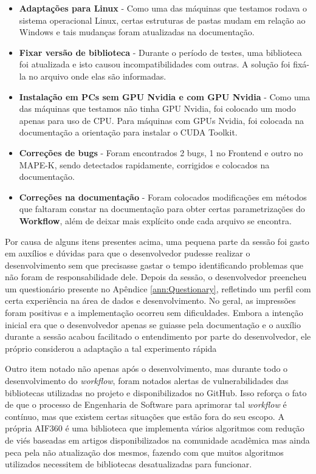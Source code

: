 \documentclass[portugues]{ic-tese}
\begin{document}
\begin{itemize}
\item \textbf{Adaptações para Linux} - Como uma das máquinas que testamos rodava o sistema operacional Linux, certas estruturas de pastas mudam em relação ao Windows e tais mudanças foram atualizadas na documentação.
\item \textbf{Fixar versão de biblioteca} - Durante o período de testes, uma biblioteca foi atualizada e isto causou incompatibilidades com outras. A solução foi fixá-la no arquivo onde elas são informadas.
\item \textbf{Instalação em PCs sem GPU Nvidia e com GPU Nvidia} - Como uma das máquinas que testamos não tinha GPU Nvidia, foi colocado um modo apenas para uso de CPU. Para máquinas com GPUs Nvidia, foi colocada na documentação a orientação para instalar o CUDA Toolkit.
\item \textbf{Correções de bugs} - Foram encontrados 2 bugs, 1 no Frontend e outro no MAPE-K, sendo detectados rapidamente, corrigidos e colocados na documentação.
\item \textbf{Correções na documentação} - Foram colocados modificações em métodos que faltaram constar na documentação para obter certas parametrizações do \textbf{Workflow}, além de deixar mais explícito onde cada arquivo se encontra.
\end{itemize}

Por causa de alguns itens presentes acima, uma pequena parte da sessão foi gasto em auxílios e dúvidas para que o desenvolvedor pudesse realizar o desenvolvimento sem que precisasse gastar o tempo identificando problemas que não foram de responsabilidade dele. Depois da sessão, o desenvolvedor preencheu um questionário presente no Apêndice \ref{ann:Questionary}, refletindo um perfil com certa experiência na área de dados e desenvolvimento. No geral, as impressões foram positivas e a implementação ocorreu sem dificuldades. Embora a intenção inicial era que o desenvolvedor apenas se guiasse pela documentação e o auxílio durante a sessão acabou facilitado o entendimento por parte do desenvolvedor, ele próprio considerou a adaptação a tal experimento rápida

Outro item notado não apenas após o desenvolvimento, mas durante todo o desenvolvimento do \textit{workflow}, foram notados alertas de vulnerabilidades das bibliotecas utilizadas no projeto e disponibilizados no GitHub. Isso reforça o fato de que o processo de Engenharia de Software para aprimorar tal \textit{workflow} é contínuo, mas que existem certas situações que estão fora do seu escopo. A própria AIF360 é uma biblioteca que implementa vários algoritmos com redução de viés baseadas em artigos disponibilizados na comunidade acadêmica mas ainda peca pela não atualização dos mesmos, fazendo com que muitos algoritmos utilizados necessitem de bibliotecas desatualizadas para funcionar.
\end{document}
